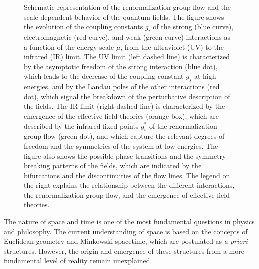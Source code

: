 \begin{figure}[h]
    \caption{Schematic representation of the renormalization group flow and the scale-dependent behavior of the quantum fields. The figure shows the evolution of the coupling constants $g_i$ of the strong (blue curve), electromagnetic (red curve), and weak (green curve) interactions as a function of the energy scale $\mu$, from the ultraviolet (UV) to the infrared (IR) limit. The UV limit (left dashed line) is characterized by the asymptotic freedom of the strong interaction (blue dot), which leads to the decrease of the coupling constant $g_s$ at high energies, and by the Landau poles of the other interactions (red dot), which signal the breakdown of the perturbative description of the fields. The IR limit (right dashed line) is characterized by the emergence of the effective field theories (orange box), which are described by the infrared fixed points $g_i^*$ of the renormalization group flow (green dot), and which capture the relevant degrees of freedom and the symmetries of the system at low energies. The figure also shows the possible phase transitions and the symmetry breaking patterns of the fields, which are indicated by the bifurcations and the discontinuities of the flow lines. The legend on the right explains the relationship between the different interactions, the renormalization group flow, and the emergence of effective field theories.}
    \label{fig:renormalization_group}
\end{figure}
The nature of space and time is one of the most fundamental questions in physics and philosophy. The current understanding of space is based on the concepts of Euclidean geometry and Minkowski spacetime, which are postulated as \textit{a priori} structures. However, the origin and emergence of these structures from a more fundamental level of reality remain unexplained.

